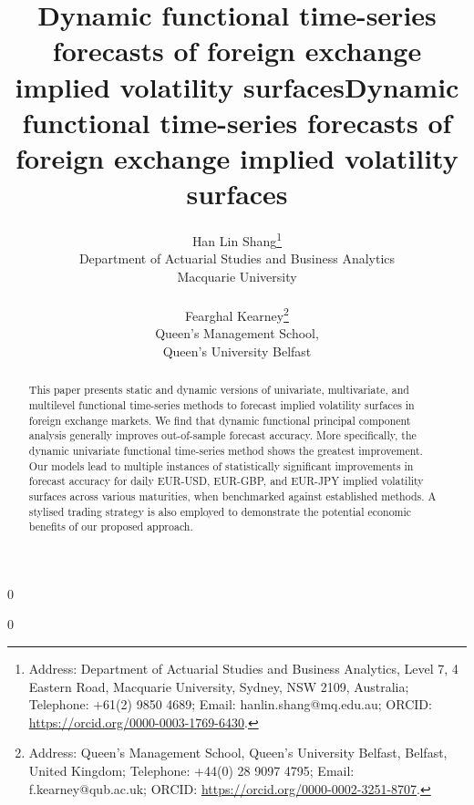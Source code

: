 \documentclass[12pt,a4paper]{article}
\date{}
\newcommand{\blind}{0}
\begin{document}
\def\spacingset#1{\renewcommand{\baselinestretch}
{#1}\small\normalsize} \spacingset{1}

\blind
{
  \title{\bf Dynamic functional time-series forecasts of foreign exchange implied volatility surfaces}
  \author{Han Lin Shang\thanks{Address: Department of Actuarial Studies and Business Analytics, Level 7, 4 Eastern Road, Macquarie University, Sydney, NSW 2109, Australia; Telephone: +61(2) 9850 4689; Email: hanlin.shang@mq.edu.au; ORCID: \url{https://orcid.org/0000-0003-1769-6430}.}
  \hspace{.2cm}\\
    Department of Actuarial Studies and Business Analytics \\
    Macquarie University \\
     \\
    Fearghal Kearney\thanks{Address: Queen's Management School, Queen's University Belfast, Belfast, United Kingdom; Telephone: +44(0) 28 9097 4795; Email: f.kearney@qub.ac.uk; ORCID: \url{https://orcid.org/0000-0002-3251-8707}.} \\
    Queen's Management School, \\
    Queen's University Belfast}
  \maketitle
} \fi


\blind
{
  \title{\bf Dynamic functional time-series forecasts of foreign exchange implied volatility surfaces}
  \maketitle
} \fi

\bigskip

\begin{abstract}
This paper presents static and dynamic versions of univariate, multivariate, and multilevel functional time-series methods to forecast implied volatility surfaces in foreign exchange markets. We find that dynamic functional principal component analysis generally improves out-of-sample forecast accuracy. More specifically, the dynamic univariate functional time-series method shows the greatest improvement. Our models lead to multiple instances of statistically significant improvements in forecast accuracy for daily EUR-USD, EUR-GBP, and EUR-JPY implied volatility surfaces across various maturities, when benchmarked against established methods. A stylised trading strategy is also employed to demonstrate the potential economic benefits of our proposed approach.
\end{abstract}
\end{document}
